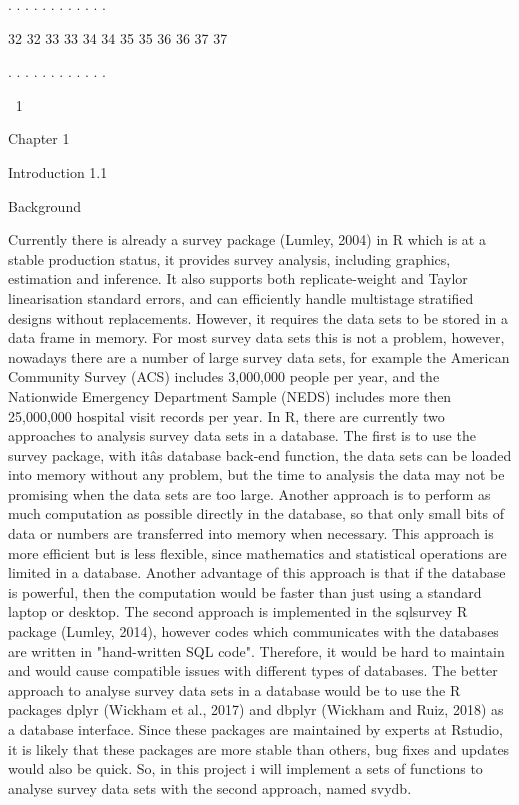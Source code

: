 .
.
.
.
.
.
.
.
.
.
.
.

32
32
33
33
34
34
35
35
36
36
37
37

.
.
.
.
.
.
.
.
.
.
.
.

1

Chapter 1

Introduction
1.1

Background

Currently there is already a survey package (Lumley, 2004) in R which is at a stable production status, it provides survey analysis, including graphics, estimation
and inference. It also supports both replicate-weight and Taylor linearisation standard errors, and can efficiently handle multistage stratified designs without replacements. However, it requires the data sets to be stored in a data frame in memory. For
most survey data sets this is not a problem, however, nowadays there are a number
of large survey data sets, for example the American Community Survey (ACS) includes 3,000,000 people per year, and the Nationwide Emergency Department Sample (NEDS) includes more then 25,000,000 hospital visit records per year.
In R, there are currently two approaches to analysis survey data sets in a database.
The first is to use the survey package, with itâs database back-end function, the data
sets can be loaded into memory without any problem, but the time to analysis the
data may not be promising when the data sets are too large.
Another approach is to perform as much computation as possible directly in the
database, so that only small bits of data or numbers are transferred into memory
when necessary. This approach is more efficient but is less flexible, since mathematics and statistical operations are limited in a database. Another advantage of this
approach is that if the database is powerful, then the computation would be faster
than just using a standard laptop or desktop.
The second approach is implemented in the sqlsurvey R package (Lumley, 2014),
however codes which communicates with the databases are written in "hand-written
SQL code". Therefore, it would be hard to maintain and would cause compatible issues with different types of databases.
The better approach to analyse survey data sets in a database would be to use the
R packages dplyr (Wickham et al., 2017) and dbplyr (Wickham and Ruiz, 2018) as a
database interface. Since these packages are maintained by experts at Rstudio, it is
likely that these packages are more stable than others, bug fixes and updates would
also be quick. So, in this project i will implement a sets of functions to analyse survey
data sets with the second approach, named svydb.


